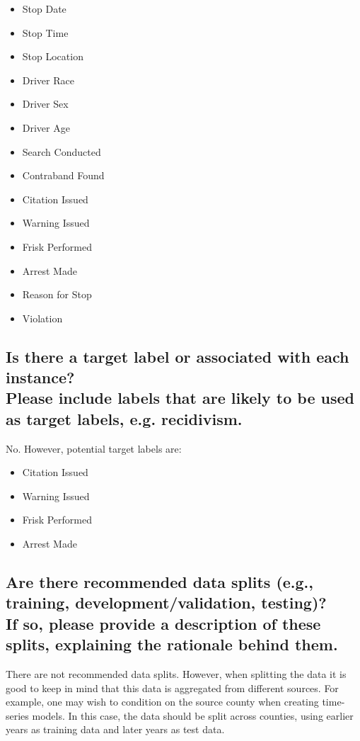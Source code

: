\documentclass[letterpaper, 10 pt, conference]{ieeeconf}  %
\newcommand{\subtitle}[1]{{\\ \small \normalfont \color{purple} #1}}
\begin{document}
 \begin{itemize}
     \item Stop Date
     \item Stop Time
     \item Stop Location
     \item Driver Race
     \item Driver Sex
     \item Driver Age
     \item Search Conducted
     \item Contraband Found
     \item Citation Issued
     \item Warning Issued
     \item Frisk Performed
    \item Arrest Made
    \item Reason for Stop
    \item Violation
 \end{itemize}

\subsection{Is there a target label or associated with each instance? \subtitle{Please include labels that are likely to be used as target labels, e.g. recidivism.}}

No. However, potential target labels are:

 \begin{itemize}
     \item Citation Issued
     \item Warning Issued
     \item Frisk Performed
    \item Arrest Made
 \end{itemize}

\subsection{Are there recommended data splits (e.g., training, development/validation, testing)? \subtitle{If so, please provide a description of these splits, explaining the rationale behind them.}}

There are not recommended data splits. However, when splitting the data it is good to keep in mind that this data is aggregated from different sources. For example, one may wish to condition on the source county when creating time-series models. In this case, the data should be split across counties, using earlier years as training data and later years as test data.
\end{document}
